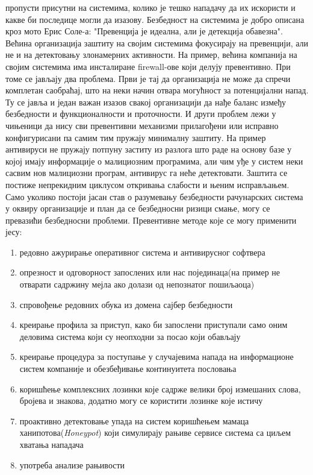 \documentclass[a4paper]{article}
\begin{document}
	пропусти присутни на системима, колико је тешко нападачу да их искористи и какве би последице могли да изазову. Безбедност на систе\-мима је добро описана кроз мото Ерис Соле-а: "Превенција је идеална, али је детекција обавезна". Већина организација заштиту на својим системима фокусира\-ју на превенцији, али не и на детектовању злона\-мерних активности. На пример, већина компанија на својим системима има инсталиране firewall-ове који делују превентивно. При томе се јављају два проблема. Први је тај да организација не може да спречи комплетан саобраћај, што на неки начин отвара могућност за потенци\-јални напад. Ту се јавља и један важан изазов свакој организацији да нађе баланс између безбедности и функционалности и проточности. И други проблем лежи у чињеници да нису сви превентивни механизми прилагођени или исправно конфигурисани па самим тим пружају мини\-малну заштиту. На пример антивируси не пружају потпуну заститу из разлога што раде на основу базе у којој имају информације о малициозним програми\-ма, али чим уђе у систем неки сасвим нов малициозни програм, антивирус га неће детектовати. Заштита се пости\-же непрекидним циклусом откривања слабости и њеним исправљањем. Само уколико постоји јасан став о разумевању безбедности рачунар\-ских система у оквиру организације и план да се безбедносни ризици смање, могу се превазићи безбедносни проблеми. 
	Превентивне методе које се могу применити јесу:
	\begin{enumerate}
		\item редовно ажурирање оперативног система и антивирусног софтвера
		\item опрезност и одговорност запослених или нас појединаца(на пример не отварати садржину мејла ако долази од непознатог пошиљаоца)
		\item спровођење редовних обука из домена сајбер безбедности 
		\item креирање профила за приступ, како би запослени приступали само оним деловима система који су неопходни за посао који обављају 
		\item креирање процедура за поступање у случајевима напада на инфор\-мационе систем компаније и обезбеђивање континуитета пословања 
		\item коришћење комплексних лозинки које садрже велики број измеша\-них слова, бројева и знакова, додатно могу се користити лозинке које истичу 			
		\item проактивно детектовање упада на систем коришћењем мамаца ханипотова({\em Honeypot}) који симулирају рањиве сервисе система са циљем хватања нападача 
		\item употреба анализе рањивости 
	\end{enumerate}
	
\end{document}
